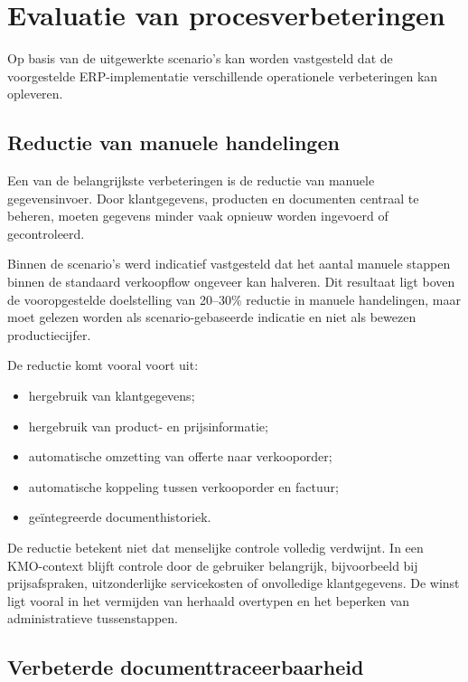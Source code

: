 \section{Evaluatie van procesverbeteringen}
\label{sec:procesverbeteringen}

Op basis van de uitgewerkte scenario's kan worden vastgesteld dat de voorgestelde ERP-implementatie verschillende operationele verbeteringen kan opleveren.

\subsection{Reductie van manuele handelingen}

Een van de belangrijkste verbeteringen is de reductie van manuele gegevensinvoer. Door klantgegevens, producten en documenten centraal te beheren, moeten gegevens minder vaak opnieuw worden ingevoerd of gecontroleerd.

Binnen de scenario's werd indicatief vastgesteld dat het aantal manuele stappen binnen de standaard verkoopflow ongeveer kan halveren. Dit resultaat ligt boven de vooropgestelde doelstelling van 20--30\% reductie in manuele handelingen, maar moet gelezen worden als scenario-gebaseerde indicatie en niet als bewezen productiecijfer.

De reductie komt vooral voort uit:
\begin{itemize}
    \item hergebruik van klantgegevens;
    \item hergebruik van product- en prijsinformatie;
    \item automatische omzetting van offerte naar verkooporder;
    \item automatische koppeling tussen verkooporder en factuur;
    \item geïntegreerde documenthistoriek.
\end{itemize}

De reductie betekent niet dat menselijke controle volledig verdwijnt. In een KMO-context blijft controle door de gebruiker belangrijk, bijvoorbeeld bij prijsafspraken, uitzonderlijke servicekosten of onvolledige klantgegevens. De winst ligt vooral in het vermijden van herhaald overtypen en het beperken van administratieve tussenstappen.

\subsection{Verbeterde documenttraceerbaarheid}

